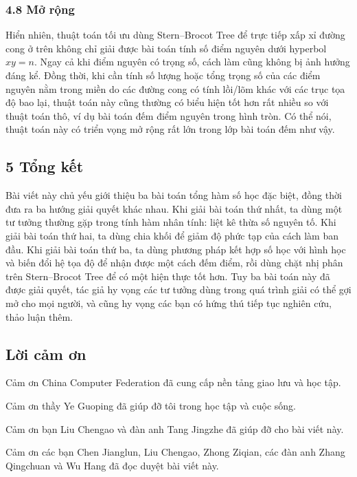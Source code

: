 \documentclass[11pt]{article}
\begin{document}
\subsubsection*{4.8 Mở rộng}

Hiển nhiên, thuật toán tối ưu dùng Stern--Brocot Tree để trực tiếp xấp xỉ
đường cong ở trên không chỉ giải được bài toán tính số điểm nguyên dưới hyperbol
\(xy=n\). Ngay cả khi điểm nguyên có trọng số, cách làm cũng không bị ảnh
hưởng đáng kể. Đồng thời, khi cần tính số lượng hoặc tổng trọng số của các điểm
nguyên nằm trong miền do các đường cong có tính lồi/lõm khác với các trục tọa
độ bao lại, thuật toán này cũng thường có biểu hiện tốt hơn rất nhiều so với
thuật toán thô, ví dụ bài toán đếm điểm nguyên trong hình tròn. Có thể nói,
thuật toán này có triển vọng mở rộng rất lớn trong lớp bài toán đếm như vậy.

\subsection*{5 Tổng kết}

Bài viết này chủ yếu giới thiệu ba bài toán tổng hàm số học đặc biệt, đồng
thời đưa ra ba hướng giải quyết khác nhau. Khi giải bài toán thứ nhất, ta dùng
một tư tưởng thường gặp trong tính hàm nhân tính: liệt kê thừa số nguyên tố.
Khi giải bài toán thứ hai, ta dùng chia khối để giảm độ phức tạp của cách làm
ban đầu. Khi giải bài toán thứ ba, ta dùng phương pháp kết hợp số học với hình
học và biến đổi hệ tọa độ để nhận được một cách đếm điểm, rồi dùng chặt nhị
phân trên Stern--Brocot Tree để có một hiện thực tốt hơn. Tuy ba bài toán này
đã được giải quyết, tác giả hy vọng các tư tưởng dùng trong quá trình giải có
thể gợi mở cho mọi người, và cũng hy vọng các bạn có hứng thú tiếp tục nghiên
cứu, thảo luận thêm.

\subsection*{Lời cảm ơn}

Cảm ơn China Computer Federation đã cung cấp nền tảng giao lưu và học tập.

Cảm ơn thầy Ye Guoping đã giúp đỡ tôi trong học tập và cuộc sống.

Cảm ơn bạn Liu Chengao và đàn anh Tang Jingzhe đã giúp đỡ cho bài viết này.

Cảm ơn các bạn Chen Jianglun, Liu Chengao, Zhong Ziqian, các đàn anh Zhang
Qingchuan và Wu Hang đã đọc duyệt bài viết này.
\end{document}
